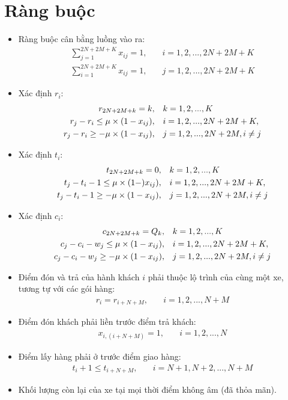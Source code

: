 \documentclass[3p,12pt]{article}
\begin{document}
	\section{Ràng buộc}
	\begin{itemize}
		\item Ràng buộc cân bằng luồng vào ra:
		\begin{align}
			\sum_{j=1}^{2N+2M+K} x_{ij} = 1,\quad & i=1,2,...,2N+2M+K \\
			\sum_{i=1}^{2N+2M+K} x_{ij} = 1,\quad & j=1,2,...,2N+2M+K
		\end{align}
		\item Xác định $r_i$:
		\begin{align}
			r_{2N+2M+k} = k,\quad & k=1,2,...,K \\
			r_j - r_i\leq \mu\times (1 - x_{ij}),\quad & i=1,2,...,2N+2M+K, \\
			r_j - r_i\geq -\mu\times (1 -x_{ij}),\quad & j=1,2,...,2N+2M, i\ne j \notag
		\end{align}
		\item Xác định $t_i$:
		\begin{align}
			t_{2N+2M+k} = 0,\quad & k=1,2,...,K \\
			t_j - t_i -1\leq \mu\times (1 - )x_{ij}),\quad & i=1,2,...,2N+2M+K, \\
			t_j - t_i -1\geq -\mu\times (1 - x_{ij}),\quad & j=1,2,...,2N+2M, i\ne j \notag
		\end{align}
		\item Xác định $c_i$:
		\begin{align}
			c_{2N+2M+k} = Q_k,\quad & k=1,2,...,K \\
			c_j - c_i - w_j\leq \mu\times (1 - x_{ij}),\quad & i=1,2,...,2N+2M+K, \\
			c_j - c_i - w_j\geq -\mu\times (1 - x_{ij}),\quad & j=1,2,...,2N+2M, i\ne j \notag
		\end{align}
		\item Điểm đón và trả của hành khách $i$ phải thuộc lộ trình của cùng một xe, tương tự với các gói hàng:
		\begin{align}
			r_i = r_{i+N+M},\quad & i=1,2,...,N+M
		\end{align}
		\item Điểm đón khách phải liền trước điểm trả khách:
		\begin{align}
			x_{i,(i+N+M)} = 1,\quad & i=1,2,...,N
		\end{align}
		\item Điểm lấy hàng phải ở trước điểm giao hàng:
		\begin{align}
			t_i + 1\leq t_{i+N+M},\quad & i=N+1,N+2,...,N+M
		\end{align}
		\item Khối lượng còn lại của xe tại mọi thời điểm không âm (đã thỏa mãn).
	\end{itemize}
\end{document}

